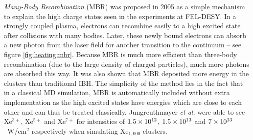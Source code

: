 

\textit{Many-Body Recombination} (MBR) was proposed in 2005\cite{Jungreuthmayer2005}
as a simple mechanism to explain the high charge states seen in the
experiments at FEL-DESY. In a strongly coupled plasma, electrons can recombine
easily to a high excited
state after collisions with many bodies. Later, these newly bound electrons can
absorb a new photon from the laser field for another transition to the
continuum -- see figure \ref{fig:heating:mbr}.
Because MBR is much more efficient than three-body
recombination (due to the large density of charged particles), much more
photons are absorbed this way. It was also shown that MBR deposited more energy
in the clusters than traditional IBH.
The simplicity of the
method lies in the fact that in a classical MD simulation, MBR is automatically
included without extra implementation as the high excited states have energies
which are close to each other and can thus be treated classically.
Jungreuthmayer \textit{et al.} were able
to see Xe$^{3+}$, Xe$^{5+}$ and Xe$^{7+}$ for intensities of $\ten{1.5}{12}$,
$\ten{1.5}{13}$ and $\ten{7}{13}$~W/cm$^2$ respectively when simulating
Xe$_{1,000}$ clusters.


